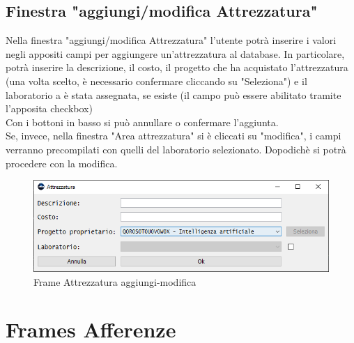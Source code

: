         \subsection {Finestra "aggiungi/modifica Attrezzatura"}
            Nella finestra "aggiungi/modifica Attrezzatura" l'utente potrà inserire i valori negli appositi campi per aggiungere un'attrezzatura al database. In particolare, potrà inserire la descrizione, il costo, il progetto che ha acquistato l'attrezzatura (una volta scelto, è necessario confermare cliccando su "Seleziona") e il laboratorio a è stata assegnata, se esiste (il campo può essere abilitato tramite l'apposita checkbox)\\
            Con i bottoni in basso si può annullare o confermare l'aggiunta.\\
            Se, invece, nella finestra "Area attrezzatura" si è cliccati su "modifica", i campi verranno precompilati con quelli del laboratorio selezionato. Dopodichè si potrà procedere con la modifica.
            \begin{figure}[htbp!]
                \centering
                    \vspace{2\baselineskip}
                    \includegraphics[width=0.7\linewidth]{Immagini/Frames/Frame aggiungi-modifica/Frame Attrezzatura aggiungi-modifica.png}
                \caption{Frame Attrezzatura aggiungi-modifica}
                \label{fig:Frame Attrezzatura aggiungi-modifica}
            \end{figure}

    \newpage

    \section{Frames Afferenze}
